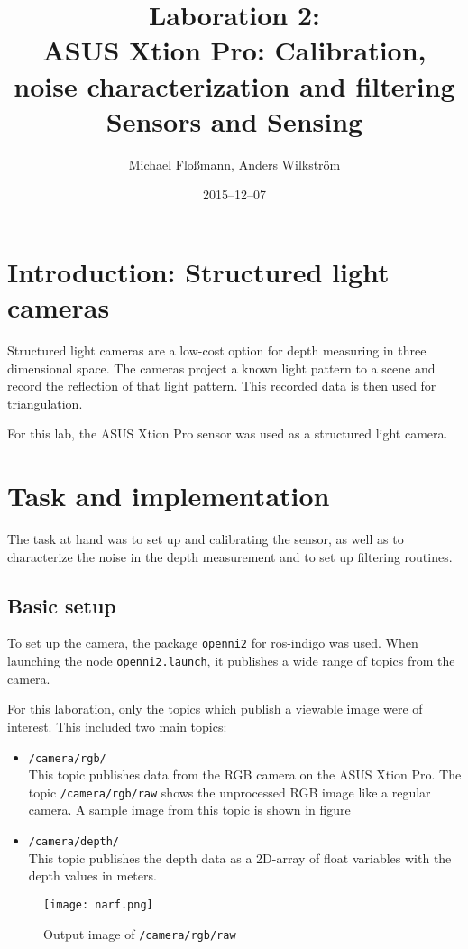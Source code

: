 \documentclass[DIV12,a4paper]{scrartcl}
\title{Laboration 2:\\ ASUS Xtion Pro: Calibration, noise characterization and filtering\\{\small Sensors and Sensing}}
\author{Michael Flo{\ss}mann, Anders Wilkstr\"om}
\date{2015--12--07}
\begin{document}
\maketitle

\section{Introduction: Structured light cameras}
Structured light cameras are a low-cost option for depth measuring in three dimensional space. The cameras project a known light pattern to a scene and record the reflection of that light pattern. This recorded data is then used for triangulation.\par
For this lab, the ASUS Xtion Pro sensor was used as a structured light camera.
\section{Task and implementation}
The task at hand was to set up and calibrating the sensor, as well as to characterize the noise in the depth measurement and to set up filtering routines.
\subsection{Basic setup}
To set up the camera, the package \texttt{openni2} for ros-indigo was used. When launching the node \texttt{openni2.launch}, it publishes a wide range of topics from the camera.\par %
For this laboration, only the topics which publish a viewable image were of interest. This included two main topics:%

\begin{itemize}
  \item \texttt{/camera/rgb/}\\
    This topic publishes data from the RGB camera on the ASUS Xtion Pro. The topic \texttt{/camera/rgb/raw} shows the unprocessed RGB image like a regular camera. A sample image from this topic is shown in figure %
  \item \texttt{/camera/depth/}\\
    This topic publishes the depth data as a 2D-array of float variables with the depth values in meters.
\end{itemize}

\begin{figure}
  \centering
  \texttt{[image: narf.png]}
  \label{fig:rgb-raw}
  \caption{Output image of \texttt{/camera/rgb/raw}}
\end{figure}
\end{document}
